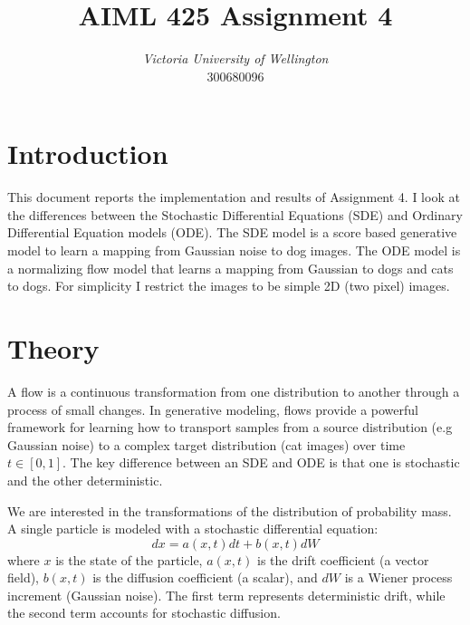 \documentclass[conference,a4paper]{IEEEtran}
\begin{document}
\title{AIML 425 Assignment 4 %
}

\author{
\textit{Victoria University of Wellington}\\
300680096}


\maketitle

\section{Introduction}

This document reports the implementation and results of Assignment 4. I look at the differences between the Stochastic Differential Equations (SDE) and Ordinary Differential Equation models (ODE). The SDE model is a score based generative model to learn a mapping from Gaussian noise to dog images. The ODE model is a normalizing flow model that learns a mapping from Gaussian to dogs and cats to dogs. For simplicity I restrict the images to be simple 2D (two pixel) images.

\section{Theory}

A flow is a continuous transformation from one distribution to another through a process of small changes. In generative modeling, flows provide a powerful framework for learning how to transport samples from a source distribution (e.g Gaussian noise) to a complex target distribution (cat images) over time $t \in [0, 1]$. The key difference between an SDE and ODE is that one is stochastic and the other deterministic.

We are interested in the transformations of the distribution of probability mass. A single particle is modeled with a stochastic differential equation:
\begin{equation}
    \label{eq:sde_particle}
    dx = a(x, t)dt + b(x, t)dW
\end{equation}
where $x$ is the state of the particle, $a(x, t)$ is the drift coefficient (a vector field), $b(x, t)$ is the diffusion coefficient (a scalar), and $dW$ is a Wiener process increment (Gaussian noise). The first term represents deterministic drift, while the second term accounts for stochastic diffusion.
\end{document}
